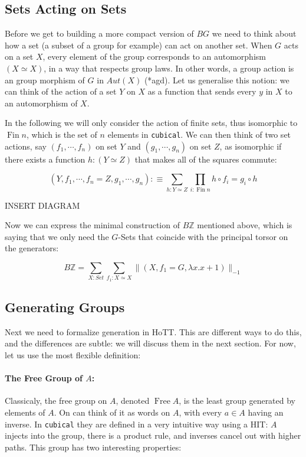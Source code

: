 \documentclass{article}
\DeclareMathOperator{\fin}{Fin}
\DeclareMathOperator{\free}{Free}
\begin{document}
\subsection{Sets Acting on Sets}

Before we get to building a more compact version of $BG$ we need to think about how a set (a subset of a group for example) can act on another set. When $G$ acts on a set $X$, every element of the group corresponds to an automorphism $(X \simeq X)$, in a way that respects group laws. In other words, a group action is an group morphism of $G$ in $Aut(X)$ (*agd). Let us generalise this notion: we can think of the action of a set $Y$ on $X$ as a function that sends every $y$ in $X$ to an automorphism of $X$.

In the following we will only consider the action of finite sets, thus isomorphic to $\fin n$, which is the set of $n$ elements in \verb|cubical|. We can then think of two set actions, say  $(f_1,\cdots,f_{n})$ on set $Y$ and $(g_1,\cdots,g_n)$ on set $Z$, as isomorphic if there exists a function $h : (Y \simeq Z)$ that makes all of the squares commute:

\[(Y, f_1,\cdots, f_n = Z, g_1,\cdots, g_{n}) :\equiv \sum_{h : Y \simeq Z } \prod_{i : \fin n} h \circ f_{i} = g_{i} \circ h\]

INSERT DIAGRAM

Now we can express the minimal construction of $B \mathbb{Z}$ mentioned above, which is saying that we only need the $G$-Sets that coincide with the principal torsor on the generators:

\[B \mathbb{Z} = \sum_{X : Set} \sum_{f_{1} : X \simeq X} \| (X,f_1 = G, \lambda x . x + 1) \|_{-1}\]

\subsection{Generating Groups}

Next we need to formalize generation in HoTT. This are different ways to do this, and the differences are subtle: we will discuss them in the next section. For now, let us use the most flexible definition:

\paragraph{The Free Group of $A$:} Classicaly, the free group on $A$, denoted $\free A$, is the least group generated by elements of $A$. On can think of it as words on $A$, with every $a \in A$ having an inverse. In \verb|cubical| they are defined in a very intuitive way using a HIT: $A$ injects into the group, there is a product rule, and inverses cancel out with higher paths. This group has two interesting properties:
\end{document}
